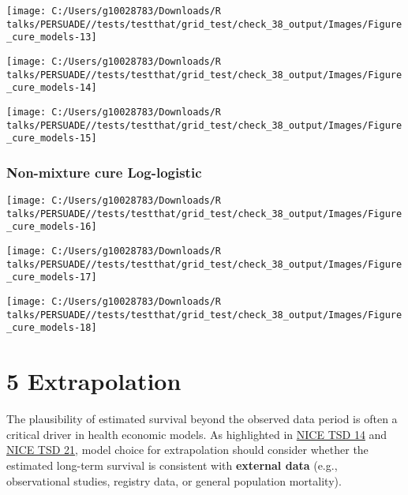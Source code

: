\documentclass[
]{article}
\begin{document}
\begin{flushleft}\texttt{[image: C:/Users/g10028783/Downloads/R talks/PERSUADE//tests/testthat/grid\_test/check\_38\_output/Images/Figure\_cure\_models-13]} \end{flushleft}

\begin{flushleft}\texttt{[image: C:/Users/g10028783/Downloads/R talks/PERSUADE//tests/testthat/grid\_test/check\_38\_output/Images/Figure\_cure\_models-14]} \end{flushleft}

\begin{flushleft}\texttt{[image: C:/Users/g10028783/Downloads/R talks/PERSUADE//tests/testthat/grid\_test/check\_38\_output/Images/Figure\_cure\_models-15]} \end{flushleft}

\clearpage

\subsubsection{Non-mixture cure
Log-logistic}\label{non-mixture-cure-log-logistic}

\begin{flushleft}\texttt{[image: C:/Users/g10028783/Downloads/R talks/PERSUADE//tests/testthat/grid\_test/check\_38\_output/Images/Figure\_cure\_models-16]} \end{flushleft}

\begin{flushleft}\texttt{[image: C:/Users/g10028783/Downloads/R talks/PERSUADE//tests/testthat/grid\_test/check\_38\_output/Images/Figure\_cure\_models-17]} \end{flushleft}

\begin{flushleft}\texttt{[image: C:/Users/g10028783/Downloads/R talks/PERSUADE//tests/testthat/grid\_test/check\_38\_output/Images/Figure\_cure\_models-18]} \end{flushleft}

\clearpage

\section{5 Extrapolation}\label{extrapolation}

The plausibility of estimated survival beyond the observed data period
is often a critical driver in health economic models. As highlighted in
\href{https://nicedsu.org.uk/wp-content/uploads/2016/03/NICE-DSU-TSD-Survival-analysis.updated-March-2013.v2.pdf}{NICE
TSD 14} and \href{https://www.sheffield.ac.uk/media/34188/download}{NICE
TSD 21}, model choice for extrapolation should consider whether the
estimated long-term survival is consistent with \textbf{external data}
(e.g., observational studies, registry data, or general population
mortality).
\end{document}
